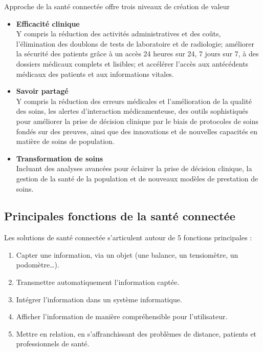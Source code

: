 \documentclass[12pt]{article}
\begin{document}
Approche de la santé connectée offre trois niveaux de création de valeur
\begin{itemize}
	\item \textbf{Efficacité clinique}\\
	Y compris la réduction des activités administratives et des coûts, l’élimination des doublons de tests de laboratoire et de radiologie; améliorer la sécurité des patients grâce à un accès 24 heures sur 24, 7 jours sur 7, à des dossiers médicaux complets et lisibles; et accélérer l'accès aux antécédents médicaux des patients et aux informations vitales.
	\item \textbf{Savoir partagé}\\
	Y compris la réduction des erreurs médicales et l'amélioration de la qualité des soins, les alertes d'interaction médicamenteuse, des outils sophistiqués pour améliorer la prise de décision clinique par le biais de protocoles de soins fondés sur des preuves, ainsi que des innovations et de nouvelles capacités en matière de soins de population.
	\item \textbf{Transformation de soins}\\
	Incluant des analyses avancées pour éclairer la prise de décision clinique, la gestion de la santé de la population et de nouveaux modèles de prestation de soins.
\end{itemize}

\subsection{Principales fonctions de la santé connectée}
Les solutions de santé connectée s’articulent autour de 5 fonctions principales :
\begin{enumerate}
	\item Capter une information, via un objet (une balance, un tensiomètre, un podomètre…).
	\item Transmettre automatiquement l’information captée.
	\item Intégrer l’information dans un système informatique.
	\item Afficher l’information de manière compréhensible pour l’utilisateur.
	\item Mettre en relation, en s’affranchissant des problèmes de distance, patients et professionnels de santé.
\end{enumerate}
\end{document}
